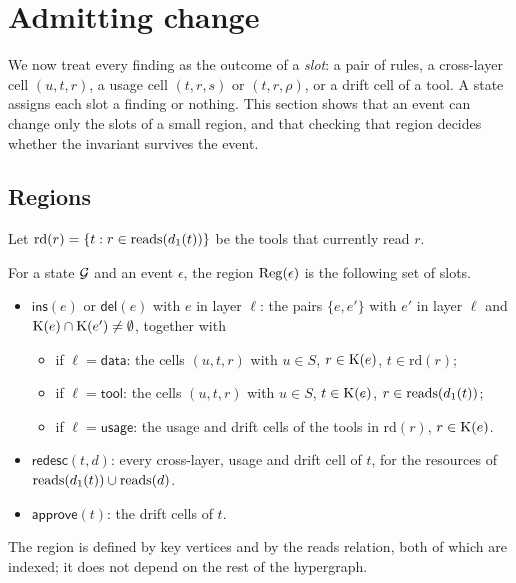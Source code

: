 \section{Admitting change}\label{sec:admission}

We now treat every finding as the outcome of a \emph{slot}: a pair of rules, a cross-layer cell $(u, t, r)$, a usage cell $(t, r, s)$ or $(t, r, \rho)$, or a drift cell of a tool. A state assigns each slot a finding or nothing. This section shows that an event can change only the slots of a small region, and that checking that region decides whether the invariant survives the event.

\subsection{Regions}\label{sec:region}
Let $\mathrm{rd}(r) = \{t : r \in \mathrm{reads}(d_1(t))\}$ be the tools that currently read $r$.

\begin{definition}\label{def:region}
For a state $\mathcal{G}$ and an event $\epsilon$, the region $\mathrm{Reg}(\epsilon)$ is the following set of slots.
\begin{itemize}
\item $\mathsf{ins}(e)$ or $\mathsf{del}(e)$ with $e$ in layer $\ell$: the pairs $\{e, e'\}$ with $e'$ in layer $\ell$ and $\mathrm{K}(e) \cap \mathrm{K}(e') \neq \emptyset$, together with
\begin{itemize}
\item if $\ell = \mathsf{data}$: the cells $(u, t, r)$ with $u \in S$, $r \in \mathrm{K}(e)$, $t \in \mathrm{rd}(r)$;
\item if $\ell = \mathsf{tool}$: the cells $(u, t, r)$ with $u \in S$, $t \in \mathrm{K}(e)$, $r \in \mathrm{reads}(d_1(t))$;
\item if $\ell = \mathsf{usage}$: the usage and drift cells of the tools in $\mathrm{rd}(r)$, $r \in \mathrm{K}(e)$.
\end{itemize}
\item $\mathsf{redesc}(t, d)$: every cross-layer, usage and drift cell of $t$, for the resources of $\mathrm{reads}(d_1(t)) \cup \mathrm{reads}(d)$.
\item $\mathsf{approve}(t)$: the drift cells of $t$.
\end{itemize}
\end{definition}
The region is defined by key vertices and by the reads relation, both of which are indexed; it does not depend on the rest of the hypergraph.

